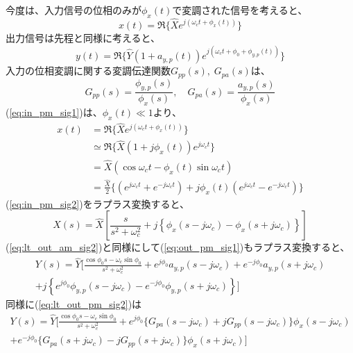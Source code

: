 \documentclass[book]{jlreq}
\begin{document}
今度は、入力信号の位相のみが$\phi_x(t)$で変調された信号を考えると、
%
\begin{equation}
    x(t) = \Re\{\hat{X} e^{j(\omega_ct + \phi_x(t))}\}
    \label{eq:in_pm_sig1}
\end{equation}
%
出力信号は先程と同様に考えると、
%
\begin{equation}
    y(t) = \Re\{\hat{Y}(1+a_{y, p}(t))e^{j(\omega_c t + \phi_0 + \phi_{y, p}(t))}\}
    \label{eq:out_pm_sig1}
\end{equation}
%
入力の位相変調に関する変調伝達関数$G_{pp}(s),\;G_{pa}(s)$は、
%
\begin{equation}
    G_{pp}(s) = \frac{\phi_{y, p}(s)}{\phi_x(s)}, \quad G_{pa}(s) = \frac{a_{y, p}(s)}{\phi_x(s)}
 \label{eq:pm_tf}
\end{equation}
%
(\ref{eq:in_pm_sig1})は、$\phi_x(t) \ll 1$より、
%
\begin{equation}
    \begin{split}
        x(t) &= \Re\{\hat{X} e^{j(\omega_c t + \phi_x(t))}\} \\
            &\simeq \Re\{\hat{X}(1+j\phi_x(t)) e^{j\omega_c t}\} \\
            &= \hat{X} (\cos\omega_c t - \phi_x(t)\sin\omega_c t ) \\
            &= \frac{\hat{X}}{2}\{(e^{j\omega_c t} + e^{-j\omega_c t}) + j \phi_x(t)(e^{j\omega_c t} - e^{-j\omega_c t})\} 
            \label{eq:in_pm_sig2}
    \end{split}
\end{equation}
%
(\ref{eq:in_pm_sig2})をラプラス変換すると、
%
\begin{equation}
    X(s) = \hat{X}\left [\frac{s}{s^2+\omega_c^2} 
    + j \left \{\phi_x(s - j\omega_c) - \phi_x(s+j\omega_c)\right \} \right ]
    \label{eq:lt_in_pm_sig2}
\end{equation}
%
(\ref{eq:lt_out_am_sig2})と同様にして(\ref{eq:out_pm_sig1})もラプラス変換すると、
%
\begin{multline}
    Y(s) = \hat{Y}\biggr [\frac{\cos\phi_0 s - \omega_c\sin\phi_0}{s^2+\omega_c^2}
        + e^{j\phi_0}a_{y, p}(s - j\omega_c) + e^{-j\phi_0}a_{y, p}(s+j\omega_c) \\
        + j\left \{e^{j\phi_0}\phi_{y,p}(s-j\omega_c) - e^{-j\phi_0}\phi_{y,p}(s+j\omega_c) \right \} \biggl ]
        \label{eq:lt_out_pm_sig2}
\end{multline}
%
同様に(\ref{eq:lt_out_pm_sig2})は
%
\begin{multline}
    Y(s) = \hat{Y}\biggr [\frac{\cos\phi_0 s - \omega_c\sin\phi_0}{s^2+\omega_c^2}
    + e^{j\phi_0}\{G_{pa}(s-j\omega_c)+j G_{pp}(s-j\omega_c)\}\phi_x(s-j\omega_c) \\
    + e^{-j\phi_0}\{G_{pa}(s+j\omega_c)- j G_{pp}(s+j\omega_c)\}\phi_x(s+j\omega_c)\biggl ]
    \label{eq:lt_out_pm_sig3}
\end{multline}
\end{document}
